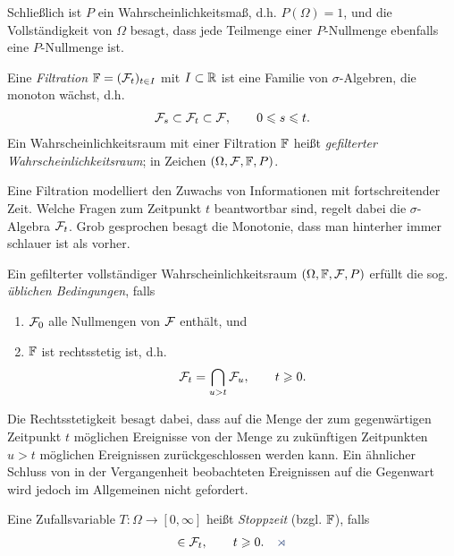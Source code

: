 Schließlich ist $P$ ein Wahrscheinlichkeitsmaß, d.h. $P(\Omega) = 1$, und die
Vollständigkeit von $\Omega$ besagt, dass jede Teilmenge einer $P$-Nullmenge
ebenfalls eine $P$-Nullmenge ist.

\begin{defn}
\label{defn:1.1}
%
Eine \emph{Filtration} $\mathbb{F} = (\mathcal{F}_t)_{t\in I}$ mit $I\subset
\mathbb{R}$ ist eine Familie von $\sigma$-Algebren, die monoton wächst, d.h.
\begin{align*}
\mathcal{F}_s \subset \mathcal{F}_t \subset \mathcal{F},\qquad 0\leqslant s\leqslant t.
\end{align*}
Ein Wahrscheinlichkeitsraum mit einer Filtration $\mathbb{F}$ heißt \emph{gefilterter
Wahrscheinlichkeitsraum}; in Zeichen
$(\Omega,\mathcal{F},\mathbb{F},P)$.\fish
\end{defn}

Eine Filtration modelliert den Zuwachs von Informationen mit fortschreitender
Zeit. Welche Fragen zum Zeitpunkt $t$ beantwortbar sind, regelt dabei die
$\sigma$-Algebra $\mathcal{F}_t$. Grob gesprochen besagt die Monotonie, dass man
hinterher immer schlauer ist als vorher.

Ein gefilterter vollständiger Wahrscheinlichkeitsraum $(\Omega,\mathbb{F},\mathcal{F},P)$
erfüllt die sog. \emph{üblichen Bedingungen}, falls
\begin{enumerate}
  \item $\mathcal{F}_0$ alle Nullmengen von $\mathcal{F}$ enthält, und
  \item $\mathbb{F}$ ist rechtsstetig ist, d.h.
\begin{align*}
\mathcal{F}_t = \bigcap_{u>t} \mathcal{F}_u,\qquad t\geqslant 0.
\end{align*}
\end{enumerate}
Die Rechtsstetigkeit besagt dabei, dass auf die Menge der zum gegenwärtigen
Zeitpunkt $t$ möglichen Ereignisse von der Menge zu zukünftigen Zeitpunkten $u>
t$ möglichen Ereignissen zurückgeschlossen werden kann. Ein ähnlicher Schluss
von in der Vergangenheit beobachteten Ereignissen auf die Gegenwart wird
jedoch im Allgemeinen nicht gefordert.



\begin{defn}
%
\label{defn:1.2}
Eine Zufallsvariable $T : \Omega \to [0, \infty]$ heißt \emph{Stoppzeit} (bzgl.
$\mathbb{F}$), falls
\begin{align*}
[T\le t] \in\FF_t,\qquad t\ge 0.\fish
\end{align*}
\end{defn}

